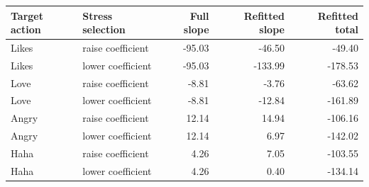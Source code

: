 \begin{tabular}{llrrr}
\toprule
Target action & Stress selection & Full slope & Refitted slope & Refitted total \\
\midrule
Likes & raise coefficient & -95.03 & -46.50 & -49.40 \\
Likes & lower coefficient & -95.03 & -133.99 & -178.53 \\
Love & raise coefficient & -8.81 & -3.76 & -63.62 \\
Love & lower coefficient & -8.81 & -12.84 & -161.89 \\
Angry & raise coefficient & 12.14 & 14.94 & -106.16 \\
Angry & lower coefficient & 12.14 & 6.97 & -142.02 \\
Haha & raise coefficient & 4.26 & 7.05 & -103.55 \\
Haha & lower coefficient & 4.26 & 0.40 & -134.14 \\
\bottomrule
\end{tabular}
